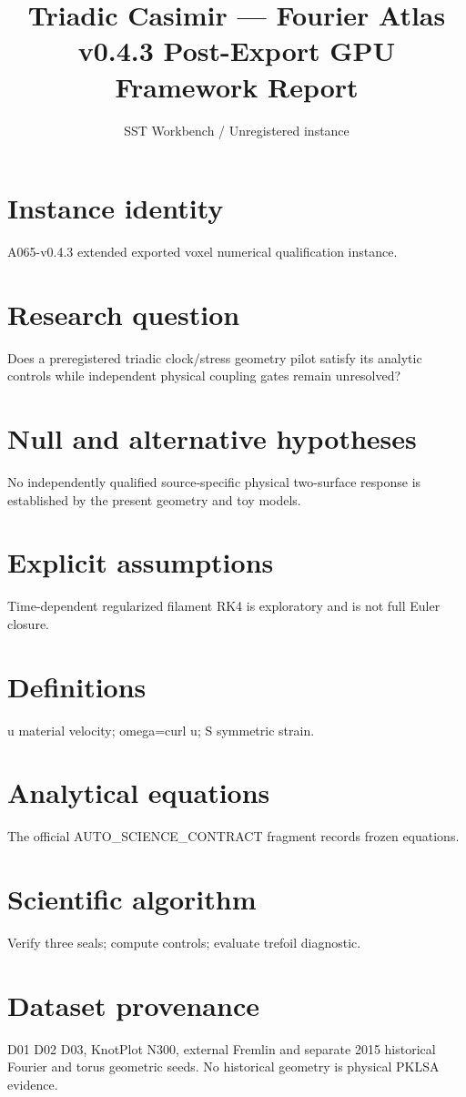 \documentclass[10pt,a4paper]{article}
\title{Triadic Casimir --- Fourier Atlas v0.4.3 Post-Export GPU Framework Report}
\author{SST Workbench / Unregistered instance}
\begin{document}
\maketitle
\section{Instance identity}
A065-v0.4.3 extended exported voxel numerical qualification instance.
\section{Research question}
Does a preregistered triadic clock/stress geometry pilot satisfy its analytic controls while independent physical coupling gates remain unresolved?
\section{Null and alternative hypotheses}
No independently qualified source-specific physical two-surface response is established by the present geometry and toy models.
\section{Explicit assumptions}
Time-dependent regularized filament RK4 is exploratory and is not full Euler closure.
\section{Definitions}
u material velocity; omega=curl u; S symmetric strain.
\section{Analytical equations}
The official AUTO\_SCIENCE\_CONTRACT fragment records frozen equations.

\section{Scientific algorithm}
Verify three seals; compute controls; evaluate trefoil diagnostic.
\section{Dataset provenance}
D01 D02 D03, KnotPlot N300, external Fremlin and separate 2015 historical Fourier and torus geometric seeds. No historical geometry is physical PKLSA evidence.
\end{document}
